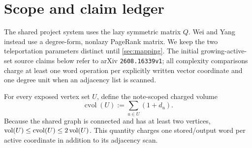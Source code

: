 \documentclass[11pt]{article}
\begin{document}
\begin{abstract}
A supplied set of original volume $V$ need only contain obstacle
coordinates above $\epsappr/8$ to support ACL repair. Same-load parameter
monotonicity, a reserved residual margin and a full-support constant shift
now give supplied work
$(1+V)\operatorname{polylog}(2+V+\epsappr^{-1}+p^{-1})$, independent
of target teleportation in the exact-real word model. Finding a suitable
set or producing native local ACL output there in near-linear work
remains open. An unsupplied $k$-type promise also admits batched local work
$O((1+V+(1+k)^3)\log(2+V))$. Preserving a tree of original twin classes
and its physical source contrast instead gives
$O((1+V)\log^4(2+V))$ work with no type-count factor, using weighted
callbacks and the same source hierarchy. All new results are proof drafts
awaiting independent review. The certified coarse refinement is ACL-only; separate exact structural
solves have the stated canonical RPPR consequences. General OP3 remains open: the local
route retains a rank factor, and the supplied route still needs discovery.
\end{abstract}

\clearpage
\tableofcontents

\section{Scope and claim ledger}
\label{sec:scope}



The shared project system uses the lazy symmetric matrix $Q$.  Wei and Yang
instead use a degree-form, nonlazy PageRank matrix.  We keep the two
teleportation parameters distinct until \cref{sec:mapping}.  The initial growing-active-set source claims
below refer to arXiv \texttt{2608.16339v1}; all complexity comparisons charge
at least one word operation per explicitly written vector coordinate and one
degree unit when an adjacency list is scanned.

For every exposed vertex set $U$, define the note-scoped charged volume
\begin{equation}
 \operatorname{cvol}(U):=\sum_{u\in U}(1+d_u).
 \label{eq:charged-volume}
\end{equation}
Because the shared graph is connected and has at least two vertices,
$\operatorname{vol}(U)\leq\operatorname{cvol}(U)\leq2\operatorname{vol}(U)$.  This quantity charges one
stored/output word per active coordinate in addition to its adjacency scan.
\end{document}
